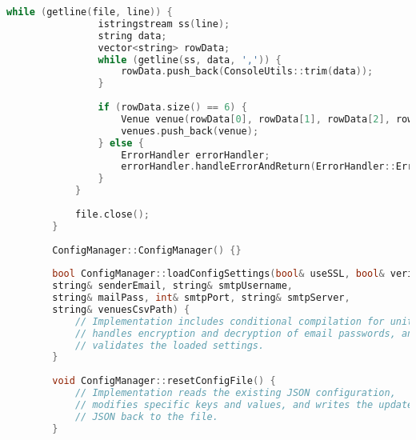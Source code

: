 \documentclass{article}
\begin{document}
\begin{mdframed}[backgroundcolor=background, hidealllines=false, innerleftmargin=15pt, innerrightmargin=5pt, innertopmargin=0pt, innerbottommargin=-5pt, linecolor=accent]
\begin{lstlisting}[language=C++]
			while (getline(file, line)) {
				istringstream ss(line);
				string data;
				vector<string> rowData;
				while (getline(ss, data, ',')) {
					rowData.push_back(ConsoleUtils::trim(data));
				}
				
				if (rowData.size() == 6) {
					Venue venue(rowData[0], rowData[1], rowData[2], rowData[3], rowData[4], stoi(rowData[5]));
					venues.push_back(venue);
				} else {
					ErrorHandler errorHandler;
					errorHandler.handleErrorAndReturn(ErrorHandler::ErrorType::INVALID_DATA_IN_CSV, venuesCsvPath);
				}
			}
			
			file.close();
		}
		
		ConfigManager::ConfigManager() {}
		
		bool ConfigManager::loadConfigSettings(bool& useSSL, bool& verifyPeer, bool& verifyHost, bool& verbose, 
		string& senderEmail, string& smtpUsername, 
		string& mailPass, int& smtpPort, string& smtpServer, 
		string& venuesCsvPath) {
			// Implementation includes conditional compilation for unit testing, 
			// handles encryption and decryption of email passwords, and 
			// validates the loaded settings.
		}
		
		void ConfigManager::resetConfigFile() {
			// Implementation reads the existing JSON configuration, 
			// modifies specific keys and values, and writes the updated 
			// JSON back to the file.
		}
	\end{lstlisting}
\end{mdframed}
	
\end{document}
